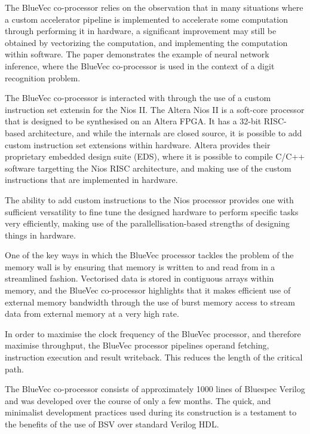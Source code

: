 \documentclass[a4paper,8pt]{report}
\begin{document}
The BlueVec co-processor relies on the observation that in many situations where
a custom accelerator pipeline is implemented to accelerate some computation
through performing it in hardware, a significant improvement may still be obtained
by vectorizing the computation, and implementing the computation within
software. The paper demonstrates the example of neural network inference, where
the BlueVec co-processor is used in the context of a digit recognition problem.

The BlueVec co-processor is interacted with through the use of a custom
instruction set extensin for the Nios II. The Altera Nios II is a soft-core processor
that is designed to be synthesised on an Altera FPGA. It has a 32-bit RISC-based
architecture, and while the internals are closed source, it is possible to add
custom instruction set extensions within hardware. Altera provides their
proprietary embedded design suite (EDS), where it is possible to compile C/C++
software targetting the Nios RISC architecture, and making use of the custom
instructions that are implemented in hardware.

The ability to add custom instructions to the Nios processor provides one with
sufficient versatility to fine tune the designed hardware to perform specific
tasks very efficiently, making use of the parallellisation-based strengths of
designing things in hardware.

One of the key ways in which the BlueVec processor tackles the problem of the
memory wall is by ensuring that memory is written to and read from in a
streamlined fashion. Vectorised data is stored in contiguous arrays within
memory, and the BlueVec co-processor highlights that it makes efficient use of
external memory bandwidth through the use of burst memory access to stream data
from external memory at a very high rate.


In order to maximise the clock frequency of the BlueVec processor, and therefore
maximise throughput, the BlueVec processor pipelines operand fetching,
instruction execution and result writeback. This reduces the length of the
critical path.

The BlueVec co-processor consists of approximately 1000 lines of Bluespec
Verilog and was developed over the course of only a few months. The quick, and
minimalist development practices used during its construction is a testament to
the benefits of the use of BSV over standard Verilog HDL.
\end{document}

